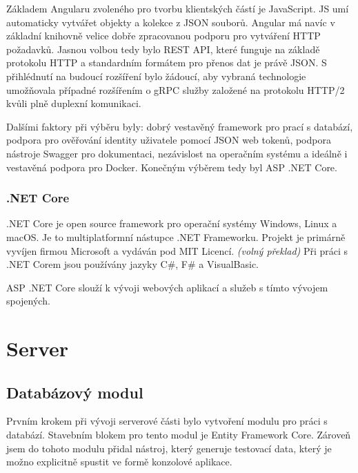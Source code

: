 \documentclass[
  biblatex,
  glossaries,
  index
]{kidiplom}
\begin{document}
Základem Angularu zvoleného pro tvorbu klientských částí je JavaScript. JS umí automaticky vytvářet objekty a kolekce z JSON souborů. Angular má navíc v základní knihovně velice dobře zpracovanou podporu pro vytváření HTTP požadavků. Jasnou volbou tedy bylo REST API, které funguje na základě protokolu HTTP a standardním formátem pro přenos dat je právě JSON. S přihlédnutí na budoucí rozšíření bylo žádoucí, aby vybraná technologie umožňovala případné rozšířením o gRPC služby založené na protokolu HTTP/2 kvůli plně duplexní komunikaci.

Dalšími faktory při výběru byly: dobrý vestavěný framework pro prací s databází, podpora pro ověřování identity uživatele pomocí JSON web tokenů, podpora nástroje Swagger pro dokumentaci, nezávislost na operačním systému a ideálně i vestavěná podpora pro Docker. Konečným výběrem tedy byl ASP .NET Core.

\subsubsection{.NET Core}
.NET Core je open source framework pro operační systémy Windows, Linux a macOS. Je to multiplatformní nástupce .NET Frameworku. Projekt je primárně vyvíjen firmou Microsoft a vydáván pod MIT Licencí. \cite{9} \textit{(volný překlad)} Při práci s .NET Corem jsou používány jazyky C\#, F\# a VisualBasic.

ASP .NET Core slouží k vývoji webových aplikací a služeb s tímto vývojem spojených.
\newpage
\section{Server}

\subsection{Databázový modul}
Prvním krokem při vývoji serverové části bylo vytvoření modulu pro práci s databází. Stavebním blokem pro tento modul je Entity Framework Core. Zároveň jsem do tohoto modulu přidal nástroj, který generuje testovací data, který je možno explicitně spustit ve formě konzolové aplikace.
\end{document}

